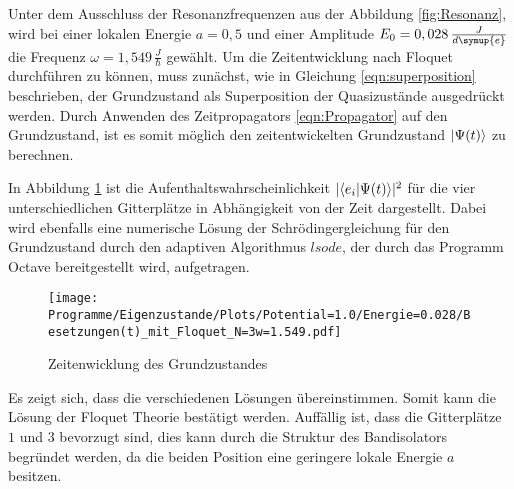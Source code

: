 Unter dem Ausschluss der Resonanzfrequenzen aus der
Abbildung \ref{fig:Resonanz}, wird bei einer lokalen Energie
$a=0,5$ und einer Amplitude $E_0=0,028\,\frac{J}{d\symup{e}}$ die Frequenz $\omega=1,549\,\frac{J}{\hbar}$ gewählt.
Um die Zeitentwicklung nach Floquet durchführen zu können, muss
zunächst, wie in Gleichung \eqref{eqn:superposition} beschrieben, der Grundzustand
als Superposition der Quasizustände ausgedrückt werden.
Durch Anwenden des Zeitpropagators \eqref{eqn:Propagator} auf den Grundzustand,
 ist es somit möglich den zeitentwickelten Grundzustand
$\ket{\Psi(t)}$ zu berechnen.

In Abbildung \ref{fig:zeitentwicklung} ist
die Aufenthaltswahrscheinlichkeit
$\lvert\braket{e_i|\Psi(t)}\rvert^2$ für
die vier unterschiedlichen Gitterplätze in Abhängigkeit von der Zeit dargestellt.
Dabei wird ebenfalls eine numerische Lösung
der Schrödingergleichung für den Grundzustand durch den
adaptiven Algorithmus $\textit{lsode}$,
der durch das Programm Octave \cite{octave}bereitgestellt wird, aufgetragen.

\begin{figure}
  \centering
  \texttt{[image: Programme/Eigenzustande/Plots/Potential=1.0/Energie=0.028/Besetzungen(t)\_mit\_Floquet\_N=3w=1.549.pdf]}
  \caption{Zeitenwicklung des Grundzustandes}
  \label{fig:zeitentwicklung}
\end{figure}

Es zeigt sich, dass die verschiedenen Lösungen übereinstimmen. Somit kann die Lösung der Floquet Theorie bestätigt werden.
Auffällig ist, dass die Gitterplätze $1$ und $3$
bevorzugt sind, dies kann durch die Struktur des Bandisolators begründet werden, da
die beiden Position eine geringere lokale Energie $a$ besitzen.
%

